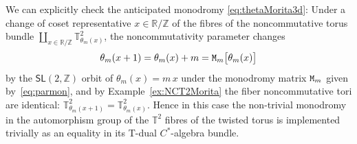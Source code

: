 \documentclass[pdftex]{sigma}
\numberwithin{equation}{section}
\newcommand{\Z}{\zed}
\newcommand{\sfSL}{\mathsf{SL}}
\newcommand{\R}{\real}
\newcommand{\zed}{{\mathbb Z}} %
\newcommand{\real}{{\mathbb R}} %
\newcommand{\torus}{{\mathbb T}} %
\begin{document}
We can
explicitly check the anticipated monodromy \eqref{eq:thetaMorita3d}:
Under a change of coset representative $x\in\real/\Z$
of the fibres of the noncommutative torus bundle
$\coprod_{x\in\R/\Z} \torus^2_{\theta_m(x)}$, the noncommutativity parameter changes
\begin{gather}\label{eq:parthetamon}
\theta_m(x+1) = \theta_m(x)+m = {\tt M}_{m}\big[\theta_m(x)\big]
\end{gather}
by the $\sfSL(2,\Z)$ orbit of $\theta_m(x)=m\,x$ under the monodromy matrix ${\tt M}_{m}$ given by~\eqref{eq:parmon}, and by Example~\ref{ex:NCT2Morita} the fiber
noncommutative tori are identical:
$\torus^2_{\theta_m(x+1)}=\torus^2_{\theta_m(x)}$. Hence in this case the
non-trivial monodromy in
the automorphism group of the $\torus^2$ fibres of the twisted torus
is implemented trivially as an equality in its T-dual $C^*$-algebra
bundle.
\end{document}
